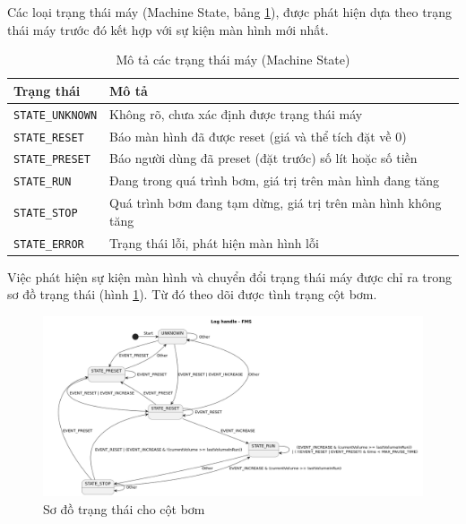 Các loại trạng thái máy (Machine State, bảng \ref{tab:screen-events}), được phát hiện dựa theo trạng thái máy trước đó kết hợp với sự kiện màn hình mới nhất.

\begin{table}[H]
\centering
\begin{tabular}{|>{\hspace{6pt}}l<{\hspace{6pt}}|>{\hspace{6pt}}p{10cm}<{\hspace{6pt}}|}
\hline
\textbf{Trạng thái} & \textbf{Mô tả} \\
\hline
\texttt{STATE\_UNKNOWN} & Không rõ, chưa xác định được trạng thái máy \\
\hline
\texttt{STATE\_RESET} & Báo màn hình đã được reset (giá và thể tích đặt về 0) \\
\hline
\texttt{STATE\_PRESET} & Báo người dùng đã preset (đặt trước) số lít hoặc số tiền \\
\hline
\texttt{STATE\_RUN} & Đang trong quá trình bơm, giá trị trên màn hình đang tăng \\
\hline
\texttt{STATE\_STOP} & Quá trình bơm đang tạm dừng, giá trị trên màn hình không tăng \\
\hline
\texttt{STATE\_ERROR} & Trạng thái lỗi, phát hiện màn hình lỗi \\
\hline
\end{tabular}
\caption{Mô tả các trạng thái máy (Machine State)}
\label{tab:screen-events} 
\end{table}

Việc phát hiện sự kiện màn hình và chuyển đổi trạng thái máy được chỉ ra trong sơ đồ trạng thái (hình \ref{fig:LogProcess_Detect-machine-state}). Từ đó theo dõi được tình trạng cột bơm.



\begin{figure}[!ht]
     \centering
    \includegraphics[width=1.0\linewidth]{Figures/LogProcess_Detect-machine-state.png}
    \caption{Sơ đồ trạng thái cho cột bơm}
    \label{fig:LogProcess_Detect-machine-state}
\end{figure}

